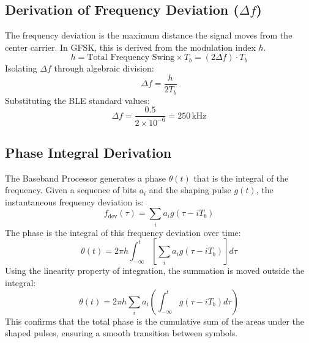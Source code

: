 \documentclass[12pt,singleside,a4paper]{report}
\begin{document}
\subsection{Derivation of Frequency Deviation ($\Delta f$)}
The frequency deviation is the maximum distance the signal moves from the center carrier. In GFSK, this is derived from the modulation index $h$. 
\begin{equation}
h = \text{Total Frequency Swing} \times T_b = (2\Delta f) \cdot T_b
\end{equation}
Isolating $\Delta f$ through algebraic division:
\begin{equation}
\Delta f = \frac{h}{2T_b}
\end{equation}
Substituting the BLE standard values:
\begin{equation}
\Delta f = \frac{0.5}{2 \times 10^{-6}} = 250 \, \text{kHz}
\end{equation}

\subsection{Phase Integral Derivation}
The Baseband Processor generates a phase $\theta(t)$ that is the integral of the frequency. Given a sequence of bits $a_i$ and the shaping pulse $g(t)$, the instantaneous frequency deviation is:
\begin{equation}
f_{\text{dev}}(\tau) = \sum_{i} a_i g(\tau - iT_b)
\end{equation}
The phase is the integral of this frequency deviation over time:
\begin{equation}
\theta(t) = 2\pi h \int_{-\infty}^{t} \left[ \sum_{i} a_i g(\tau - iT_b) \right] d\tau
\end{equation}
Using the linearity property of integration, the summation is moved outside the integral:
\begin{equation}
\theta(t) = 2\pi h \sum_{i} a_i \left( \int_{-\infty}^{t} g(\tau - iT_b) d\tau \right)
\end{equation}
This confirms that the total phase is the cumulative sum of the areas under the shaped pulses, ensuring a smooth transition between symbols.
\end{document}

